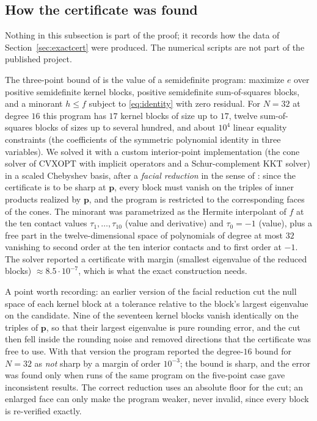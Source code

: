 \documentclass[11pt]{amsart}
\theoremstyle{definition}
\theoremstyle{remark}
\newcommand{\cand}{\mathbf{p}}
\begin{document}
\subsection{How the certificate was found}\label{sec:numerics}

Nothing in this subsection is part of the proof; it records how the data of Section~\ref{sec:exactcert} were produced. The numerical scripts are not part of the published project.

The three-point bound of \cite{CohnWoo2012} is the value of a semidefinite program: maximize $e$ over positive semidefinite kernel blocks, positive semidefinite sum-of-squares blocks, and a minorant $h\le f$ subject to \eqref{eq:identity} with zero residual. For $N=32$ at degree $16$ this program has $17$ kernel blocks of size up to $17$, twelve sum-of-squares blocks of sizes up to several hundred, and about $10^{4}$ linear equality constraints (the coefficients of the symmetric polynomial identity in three variables). We solved it with a custom interior-point implementation (the cone solver of CVXOPT \cite{CVXOPT} with implicit operators and a Schur-complement KKT solver) in a scaled Chebyshev basis, after a \emph{facial reduction} in the sense of \cite{BorweinWolkowicz1981}: since the certificate is to be sharp at $\cand$, every block must vanish on the triples of inner products realized by $\cand$, and the program is restricted to the corresponding faces of the cones. The minorant was parametrized as the Hermite interpolant of $f$ at the ten contact values $\tau_1,\dots,\tau_{10}$ (value and derivative) and $\tau_0=-1$ (value), plus a free part in the twelve-dimensional space of polynomials of degree at most $32$ vanishing to second order at the ten interior contacts and to first order at $-1$. The solver reported a certificate with margin (smallest eigenvalue of the reduced blocks) $\approx8.5\cdot10^{-7}$, which is what the exact construction needs.

A point worth recording: an earlier version of the facial reduction cut the null space of each kernel block at a tolerance relative to the block's largest eigenvalue on the candidate. Nine of the seventeen kernel blocks vanish identically on the triples of $\cand$, so that their largest eigenvalue is pure rounding error, and the cut then fell inside the rounding noise and removed directions that the certificate was free to use. With that version the program reported the degree-$16$ bound for $N=32$ as \emph{not} sharp by a margin of order $10^{-3}$; the bound is sharp, and the error was found only when runs of the same program on the five-point case gave inconsistent results. The correct reduction uses an absolute floor for the cut; an enlarged face can only make the program weaker, never invalid, since every block is re-verified exactly.
\end{document}
